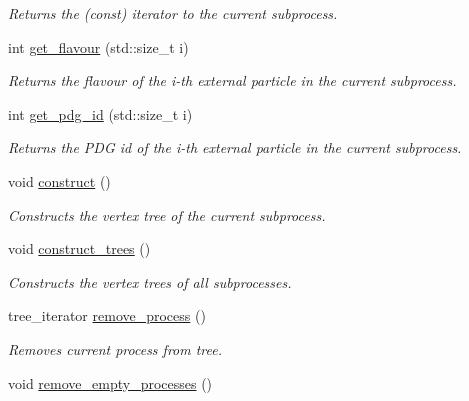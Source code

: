 \begin{DoxyCompactItemize}
\begin{DoxyCompactList}\small\item\em Returns the (const) iterator to the current subprocess. \end{DoxyCompactList}\item 
int \hyperlink{a00065_ad32142d2aeaa4c7cb48a59bf349bf974}{get\+\_\+flavour} (std\+::size\+\_\+t i)
\begin{DoxyCompactList}\small\item\em Returns the flavour of the i-\/th external particle in the current subprocess. \end{DoxyCompactList}\item 
int \hyperlink{a00065_a039e963e04dd2b56d3b3e954a785578f}{get\+\_\+pdg\+\_\+id} (std\+::size\+\_\+t i)
\begin{DoxyCompactList}\small\item\em Returns the P\+D\+G id of the i-\/th external particle in the current subprocess. \end{DoxyCompactList}\item 
\hypertarget{a00065_a000312e3e3674c447dd4335750900c93}{}void \hyperlink{a00065_a000312e3e3674c447dd4335750900c93}{construct} ()\label{a00065_a000312e3e3674c447dd4335750900c93}

\begin{DoxyCompactList}\small\item\em Constructs the vertex tree of the current subprocess. \end{DoxyCompactList}\item 
\hypertarget{a00065_a456f4c9ded09ed96900fd9db353a8347}{}void \hyperlink{a00065_a456f4c9ded09ed96900fd9db353a8347}{construct\+\_\+trees} ()\label{a00065_a456f4c9ded09ed96900fd9db353a8347}

\begin{DoxyCompactList}\small\item\em Constructs the vertex trees of all subprocesses. \end{DoxyCompactList}\item 
\hypertarget{a00065_a3315137e5b3d94680862d712d7a473e9}{}tree\+\_\+iterator \hyperlink{a00065_a3315137e5b3d94680862d712d7a473e9}{remove\+\_\+process} ()\label{a00065_a3315137e5b3d94680862d712d7a473e9}

\begin{DoxyCompactList}\small\item\em Removes current process from tree. \end{DoxyCompactList}\item 
\hypertarget{a00065_aaadcc4fc3d87aefaf15fa868e4bb9b62}{}void \hyperlink{a00065_aaadcc4fc3d87aefaf15fa868e4bb9b62}{remove\+\_\+empty\+\_\+processes} ()\label{a00065_aaadcc4fc3d87aefaf15fa868e4bb9b62}


\end{DoxyCompactItemize}
